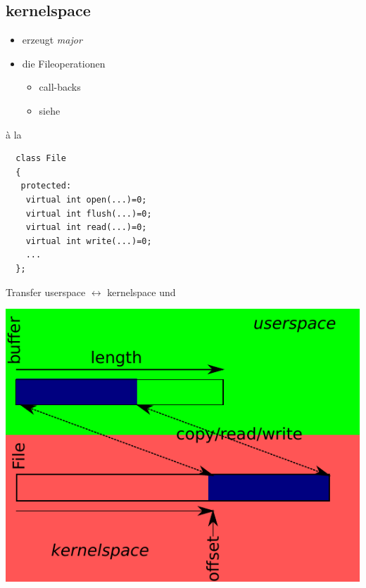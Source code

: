 \subsection{kernelspace}
\begin{frame}[fragile]{}
 \begin{itemize}
  \item erzeugt {\em major}
  \item {} die Fileoperationen
  \begin{itemize}
   \item call-backs
   \item siehe 
  \end{itemize}
 \end{itemize}
 \begin{block}{à la \CPP}
 \begin{lstlisting}
  class File
  {
   protected:
    virtual int open(...)=0;
    virtual int flush(...)=0;
    virtual int read(...)=0;
    virtual int write(...)=0;
    ...
  };
 \end{lstlisting}
 \end{block}
 
\end{frame}

\begin{frame}{Transfer userspace $\leftrightarrow$ kernelspace}
{ und }
\begin{center}
\includegraphics[height=0.75\textheight]{user-kernel-space-copy.pdf}
\end{center}
\end{frame}


